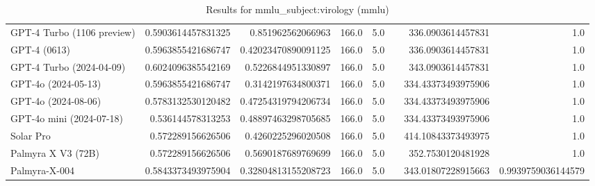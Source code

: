 \begin{table}[htp]
{\begin{tabular}{lrrrrrrr}
GPT-4 Turbo (1106 preview) & 0.5903614457831325 & 0.851962562066963 & 166.0 & 5.0 &  & 336.0903614457831 & 1.0 \\
GPT-4 (0613) & 0.5963855421686747 & 0.42023470890091125 & 166.0 & 5.0 &  & 336.0903614457831 & 1.0 \\
GPT-4 Turbo (2024-04-09) & 0.6024096385542169 & 0.5226844951330897 & 166.0 & 5.0 &  & 343.0903614457831 & 1.0 \\
GPT-4o (2024-05-13) & 0.5963855421686747 & 0.3142197634800371 & 166.0 & 5.0 &  & 334.43373493975906 & 1.0 \\
GPT-4o (2024-08-06) & 0.5783132530120482 & 0.47254319794206734 & 166.0 & 5.0 &  & 334.43373493975906 & 1.0 \\
GPT-4o mini (2024-07-18) & 0.536144578313253 & 0.48897463298705685 & 166.0 & 5.0 &  & 334.43373493975906 & 1.0 \\
Solar Pro & 0.572289156626506 & 0.4260225296020508 & 166.0 & 5.0 &  & 414.10843373493975 & 1.0 \\
Palmyra X V3 (72B) & 0.572289156626506 & 0.5690187689769699 & 166.0 & 5.0 &  & 352.7530120481928 & 1.0 \\
Palmyra-X-004 & 0.5843373493975904 & 0.32804813155208723 & 166.0 & 5.0 &  & 343.01807228915663 & 0.9939759036144579 \\
\bottomrule
\end{tabular}}
\caption{Results for mmlu_subject:virology (mmlu)}
\label{fig:mmlu_subject:virology (mmlu)}
\end{table}